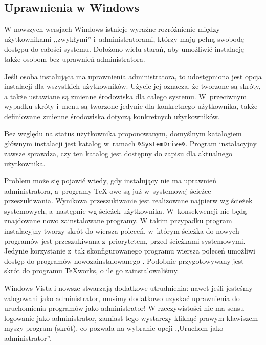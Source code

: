 \documentclass{article}
\begin{document}
\subsection{Uprawnienia w Windows}
\label{sec:winpermissions}


W nowszych wersjach Windows istnieje wyraźne rozróżnienie między
użytkownikami ,,zwykłymi'' i~administratorami, którzy mają
pełną swobodę dostępu do całości systemu.
Dołożono wielu starań, aby umożliwić instalację \TL{} także  osobom bez
uprawnień administratora.

Jeśli osoba instalująca ma uprawnienia administratora, to udostępniona jest
opcja instalacji dla wszystkich użytkowników. Użycie jej oznacza, że tworzone
są skróty, a  także  ustawiane są zmienne środowiska dla całego systemu.
W~przeciwnym wypadku skróty i~menu są tworzone jedynie dla konkretnego
użytkownika, także  definiowane zmienne środowiska dotyczą konkretnych
użytkowników.

Bez względu na status użytkownika proponowanym, domyślnym katalogiem głównym
instalacji jest katalog w~ramach \verb|%SystemDrive%|. Program instalacyjny
zawsze sprawdza, czy ten katalog jest dostępny do zapisu dla aktualnego
użytkownika.

Problem może się  pojawić wtedy, gdy instalujący \TL{} nie ma uprawnień
administratora, a~programy \TeX-owe są już w~systemowej ścieżce przeszukiwania.
Wynikowa przeszukiwanie jest realizowane najpierw wg ścieżek systemowych,
a~następnie wg ścieżek użytkownika. W~konsekwencji nie będą znajdowane nowo
zainstalowane programy. W takim przypadku program instalacyjny tworzy skrót
do wiersza poleceń, w~którym ścieżka do nowych programów \TL{} jest przeszukiwana
z~priorytetem, przed ścieżkami systemowymi. Jedynie korzystanie z~tak skonfigurowanego
programu wiersza poleceń umożliwi dostęp do  programów nowozainstalowanego \TL.
Podobnie przygotowywany jest skrót do programu \TeX{}works, o ile go zainstalowaliśmy.

Windows Vista i nowsze stwarzają dodatkowe utrudnienia: nawet jeśli
jesteśmy zalogowani jako administrator, musimy dodatkowo uzyskać uprawnienia do
uruchomienia programów jako administrator! W rzeczywistości nie ma sensu
logowanie jako administrator, zamiast tego wystarczy kliknąć prawym klawiszem
myszy program (skrót), co pozwala na wybranie opcji ,,Uruchom jako
administrator''.
\end{document}
